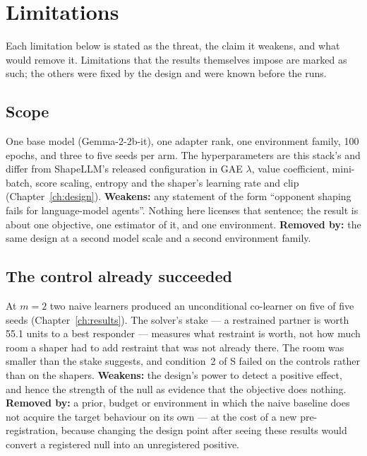 \chapter{Limitations}
\label{ch:lim}


Each limitation below is stated as the threat, the claim it weakens, and
what would remove it.
Limitations that the results themselves impose are marked as such; the
others were fixed by the design and were known before the runs.

\section{Scope}
\label{sec:lim-scope}

One base model (Gemma-2-2b-it), one adapter rank, one environment family,
100 epochs, and three to five seeds per arm.
The hyperparameters are this stack's and differ from ShapeLLM's released
configuration in GAE \(\lambda\), value coefficient, mini-batch, score
scaling, entropy and the shaper's learning rate and clip
(Chapter~\ref{ch:design}).
\textbf{Weakens:} any statement of the form ``opponent shaping fails for
language-model agents''.
Nothing here licenses that sentence; the result is about one objective, one
estimator of it, and one environment.
\textbf{Removed by:} the same design at a second model scale and a second
environment family.

\section{The control already succeeded}
\label{sec:lim-headroom}

At \(m=2\) two naive learners produced an unconditional co-learner on five
of five seeds (Chapter~\ref{ch:results}).
The solver's stake --- a restrained partner is worth 55.1 units to a best
responder --- measures what restraint is worth, not how much room a shaper
had to add restraint that was not already there.
The room was smaller than the stake suggests, and condition~2 of S failed on
the controls rather than on the shapers.
\textbf{Weakens:} the design's power to detect a positive effect, and hence
the strength of the null as evidence that the objective does nothing.
\textbf{Removed by:} a prior, budget or environment in which the naive
baseline does not acquire the target behaviour on its own --- at the cost of
a new pre-registration, because changing the design point after seeing these
results would convert a registered null into an unregistered positive.

